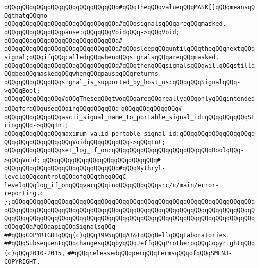 \verb|qQQqqQQqqQQqqQQqqQQqqQQqqQQqqQQq#qQQqTheqQQqvalueqQQqMASK[]qQQqmeansqQQqthatqQQqno|\newline
\verb|qQQqqQQqqQQqqQQqqQQqqQQqqQQqqQQq#qQQqsignalsqQQqareqQQqmasked.|\newline
\newline
\verb|qQQqqQQqqQQqqQQqpause:qQQqqQQqVoidqQQq->qQQqVoid;|\newline
\verb|qQQqqQQqqQQqqQQqqQQqqQQqqQQqqQQq#|\newline
\verb|qQQqqQQqqQQqqQQqqQQqqQQqqQQqqQQq#qQQqsleepqQQquntilqQQqtheqQQqnextqQQqsignal;qQQqifqQQqcalledqQQqwhenqQQqsignalsqQQqareqQQqmasked,|\newline
\verb|qQQqqQQqqQQqqQQqqQQqqQQqqQQqqQQq#qQQqthenqQQqsignalsqQQqwillqQQqstillqQQqbeqQQqmaskedqQQqwhenqQQqpauseqQQqreturns.|\newline
\newline
\newline
\verb|qQQqqQQqqQQqqQQqsignal_is_supported_by_host_os:qQQqqQQqSignalqQQq->qQQqBool;|\newline
\newline
\newline
\verb|qQQqqQQqqQQqqQQq#qQQqTheseqQQqtwoqQQqareqQQqreallyqQQqonlyqQQqintendedqQQqforqQQquseqQQqinqQQqqQQqqQQq|\newline
\verb|qQQqqQQqqQQqqQQq#|\newline
\verb|qQQqqQQqqQQqqQQqascii_signal_name_to_portable_signal_id:qQQqqQQqqQQqStringqQQq->qQQqInt;|\newline
\verb|qQQqqQQqqQQqqQQqmaximum_valid_portable_signal_id:qQQqqQQqqQQqqQQqqQQqqQQqqQQqqQQqqQQqqQQqVoidqQQqqQQqqQQq->qQQqInt;|\newline
\newline
\newline
\verb|qQQqqQQqqQQqqQQqset_log_if_on:qQQqqQQqqQQqqQQqqQQqqQQqqQQqBoolqQQq->qQQqVoid;|\newline
\verb|qQQqqQQqqQQqqQQqqQQqqQQqqQQqqQQq#|\newline
\verb|qQQqqQQqqQQqqQQqqQQqqQQqqQQqqQQq#qQQqMythryl-levelqQQqcontrolqQQqofqQQqtheqQQqC-levelqQQqlog_if_onqQQqvarqQQqinqQQqqQQqqQQqsrc/c/main/error-reporting.c|\newline
\newline
\verb|};qQQqqQQqqQQqqQQqqQQqqQQqqQQqqQQqqQQqqQQqqQQqqQQqqQQqqQQqqQQqqQQqqQQqqQQqqQQqqQQqqQQqqQQqqQQqqQQqqQQqqQQqqQQqqQQqqQQqqQQqqQQqqQQqqQQqqQQqqQQqqQQqqQQqqQQqqQQqqQQqqQQqqQQqqQQqqQQqqQQqqQQqqQQqqQQqqQQqqQQqqQQqqQQqqQQqqQQq#qQQqapiqQQqSignalsqQQq|\newline
\newline
\newline
\newline
\verb|##qQQqCOPYRIGHTqQQq(c)qQQq1995qQQqAT&TqQQqBellqQQqLaboratories.|\newline
\verb|##qQQqSubsequentqQQqchangesqQQqbyqQQqJeffqQQqProtheroqQQqCopyrightqQQq(c)qQQq2010-2015,|\newline
\verb|##qQQqreleasedqQQqperqQQqtermsqQQqofqQQqSMLNJ-COPYRIGHT.|\newline

